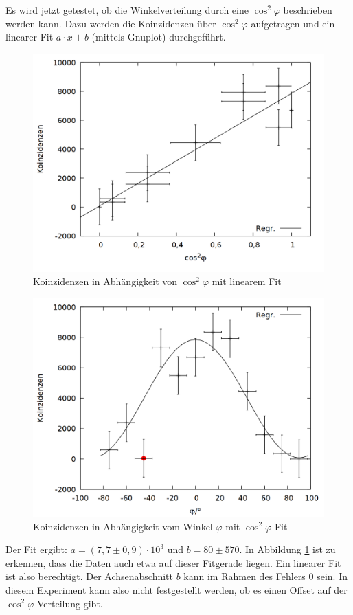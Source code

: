 Es wird jetzt getestet, ob die Winkelverteilung durch eine $\cos^2{\varphi}$ beschrieben werden kann. Dazu werden die Koinzidenzen über $\cos^2{\varphi}$ aufgetragen und ein linearer Fit $a\cdot x + b$ (mittels Gnuplot) durchgeführt. \\

\begin{figure}
\centering
\includegraphics[width=0.75\linewidth]{data/friedrich/winkel_cos.png}
\caption{Koinzidenzen in Abhängigkeit von $\cos^2{\varphi}$ mit linearem Fit}
\label{fig:winkel_cos}
\end{figure}

\begin{figure}
\centering
\includegraphics[width=0.75\linewidth]{data/friedrich/winkel_ges.png}
\caption{Koinzidenzen in Abhängigkeit vom Winkel $\varphi$ mit $\cos^2{\varphi}$-Fit}
\label{fig:winkel_ges}
\end{figure}

Der Fit ergibt: $a = (7,7 \pm 0,9)\cdot 10^3$ und $b = 80 \pm 570$. In Abbildung \ref{fig:winkel_cos} ist zu erkennen, dass die Daten auch etwa auf dieser Fitgerade liegen. Ein linearer Fit ist also berechtigt. Der Achsenabschnitt $b$ kann im Rahmen des Fehlers 0 sein. In diesem Experiment kann also nicht festgestellt werden, ob es einen Offset auf der $\cos^2{\varphi}$-Verteilung gibt.\\

